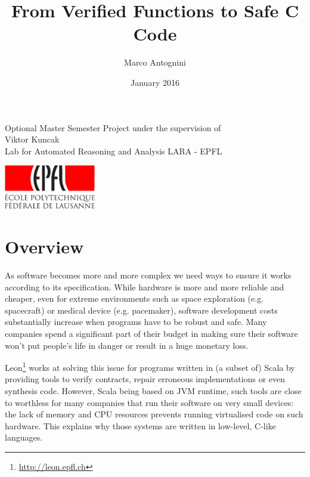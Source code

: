 \documentclass{article}
\title{From Verified Functions to Safe C Code}
\date{January 2016}
\author{Marco Antognini}
\begin{document}
\maketitle

\vfill

\begin{center}
    Optional Master Semester Project under the supervision of \\
    Viktor Kuncak \\
    Lab for Automated Reasoning and Analysis LARA - EPFL
\end{center}

\begin{center}
    \includegraphics[width = 40mm]{res/epfl-logo}
\end{center}

\newpage
{}





\section{Overview}

As software becomes more and more complex we need ways to ensure it works
according to its specification. While hardware is more and more reliable and
cheaper, even for extreme environments such as space exploration (e.g.
spacecraft) or medical device (e.g. pacemaker), software development costs
substantially increase when programs have to be robust and safe. Many companies
spend a significant part of their budget in making sure their software won't put
people's life in danger or result in a huge monetary loss.

Leon\footnote{\url{http://leon.epfl.ch}} works at solving this issue for
programs written in (a subset of) Scala by providing tools to verify contracts,
repair erroneous implementations or even synthesis code. However, Scala being
based on JVM runtime, such tools are close to worthless for many companies that
run their software on very small devices: the lack of memory and CPU resources
prevents running virtualised code on such hardware. This explains why those
systems are written in low-level, C-like languages.
\end{document}
